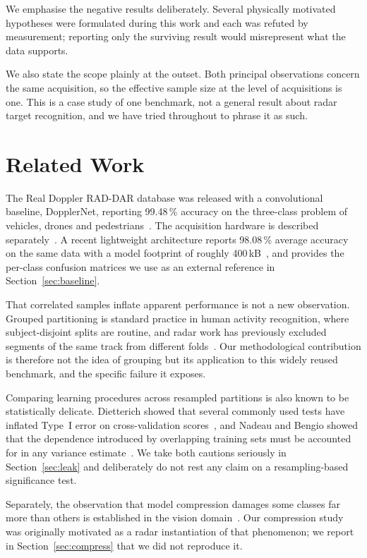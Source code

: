 \documentclass[conference]{IEEEtran}
\begin{document}
We emphasise the negative results deliberately. Several physically motivated
hypotheses were formulated during this work and each was refuted by
measurement; reporting only the surviving result would misrepresent what the
data supports.

We also state the scope plainly at the outset. Both principal observations
concern the same acquisition, so the effective sample size at the level of
acquisitions is one. This is a case study of one benchmark, not a general
result about radar target recognition, and we have tried throughout to phrase
it as such.

\section{Related Work}

The Real Doppler RAD-DAR database was released with a convolutional
baseline, DopplerNet, reporting 99.48\,\% accuracy on the three-class problem
of vehicles, drones and pedestrians~\cite{roldan2020}. The acquisition hardware
is described separately~\cite{quevedo2019}. A recent lightweight
architecture reports 98.08\,\% average accuracy on the same data with a model
footprint of roughly 400\,kB~\cite{zhang2025}, and provides the per-class
confusion matrices we use as an external reference in
Section~\ref{sec:baseline}.

That correlated samples inflate apparent performance is not a new
observation. Grouped partitioning is standard practice in human activity
recognition, where subject-disjoint splits are routine, and radar work has
previously excluded segments of the same track from different
folds~\cite{buchman2022}. Our methodological contribution is therefore not the
idea of grouping but its application to this widely reused benchmark, and the
specific failure it exposes.

Comparing learning procedures across resampled partitions is also known to be
statistically delicate. Dietterich showed that several commonly used tests
have inflated Type~I error on cross-validation
scores~\cite{dietterich1998}, and Nadeau and Bengio showed that the
dependence introduced by overlapping training sets must be accounted for in
any variance estimate~\cite{nadeau2003}. We take both cautions seriously in
Section~\ref{sec:leak} and deliberately do not rest any claim on a
resampling-based significance test.

Separately, the observation that model compression damages some classes far
more than others is established in the vision
domain~\cite{hooker2019,hooker2020}. Our compression study was originally
motivated as a radar instantiation of that phenomenon; we report in
Section~\ref{sec:compress} that we did not reproduce it.
\end{document}
